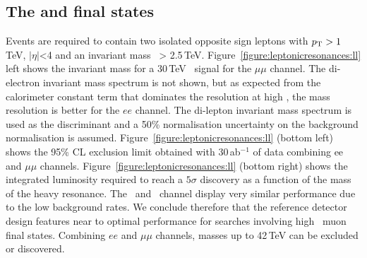 \documentclass[a4paper,11pt]{article}
\begin{document}
\subsection{The \texorpdfstring{\ee}{ee} and \texorpdfstring{\mumu}{mumu} final states}
\label{sec:lepee}

Events are required to contain two isolated opposite sign leptons with $p_{\text{T}} > 1$\,TeV, $|\eta|$<4 and an invariant mass \mll\ > 2.5\,TeV.
Figure~\ref{figure:leptonicresonances:ll} left shows the invariant mass for a 30\,TeV \ZpSSM\ signal for the $\mu\mu$ channel. The di-electron invariant mass spectrum is not shown, but as expected from the calorimeter constant term that dominates the resolution at high \pt, the mass resolution is better for the $ee$ channel.
The di-lepton invariant mass spectrum is used as the discriminant and a 50\% normalisation uncertainty on the background normalisation is assumed.
Figure~\ref{figure:leptonicresonances:ll} (bottom left) shows the 95\% CL exclusion limit obtained with 30\,ab$^{-1}$ of data combining ee and $\mu\mu$ channels. Figure~\ref{figure:leptonicresonances:ll} (bottom right) shows the integrated luminosity required to reach a $5\sigma$ discovery as a function of the mass of the heavy resonance. The \Zpee\ and \Zpmumu\ channel display very similar performance due to the low background rates. We conclude therefore that the reference detector design features near to optimal performance for searches involving high \pt\ muon final states. Combining $ee$ and $\mu\mu$ channels, masses up to 42\,TeV can be excluded or discovered.
\end{document}
